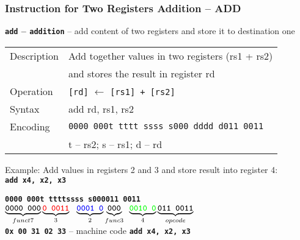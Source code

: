 \documentclass{beamer}
\begin{document}
\begin{frame}
\frametitle{Instruction for Two Registers Addition -- ADD}

\textbf{\texttt{add} -- \texttt{addition}} -- add content of two registers and store it to destination one

\bigskip

\begin{tabular}{|l|l|}\hline
Description & Add together values in two registers (rs1 + rs2) \\
            & and stores the result in register rd \\ \hline
Operation& \texttt{[rd]} $\leftarrow$ \texttt{[rs1] + [rs2]} \\ \hline
Syntax & add rd, rs1, rs2 \\ \hline
Encoding & \texttt{0000 000t tttt ssss s000 dddd d011 0011} \\
 & t -- rs2; s -- rs1; d -- rd \\ \hline
\end{tabular}

\bigskip

Example: Add values in registers 2 and 3 and store result into register 4:\\
\textbf{\texttt{add x4, x2, x3}}

\textbf{\texttt{0000 000\hspace{0.08cm}\color{red}t tttt}}\phantom{x}\hspace{0.13cm}\textbf{\texttt{\color{blue}ssss s}}\hspace{0.1cm}\textbf{\texttt{000\hspace{0.05cm}011 0011}}\\
$\underbrace{\textbf{\texttt{0000 000}}}_{funct7}
\underbrace{\textbf{\texttt{\color{red}0 0011}}}_{3}
\texttt{ }\underbrace{\textbf{\texttt{\color{blue}0001 0}}}_{2}
\underbrace{\textbf{\texttt{000}}}_{func3}\phantom{i}
\underbrace{\textbf{\texttt{\color{green}0010 0}}}_{4}
\underbrace{\textbf{\texttt{011 0011}}}_{opcode}$\\

\textbf{\texttt{0x 00 31 02 33}} -- machine code \textbf{\texttt{add x4, x2, x3}}


\end{frame}
\end{document}
